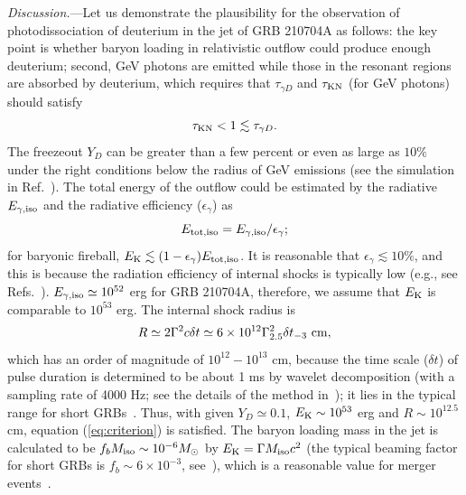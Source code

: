 \documentclass[prd,twocolumn,amsmath,amssymb,aps]{revtex4-2} %
\begin{document}
\textit{Discussion.}---Let us demonstrate
the plausibility for the observation of photodissociation of deuterium in the jet of GRB 210704A as follows: the key point is whether baryon loading in relativistic outflow could produce enough deuterium;
second, GeV photons are emitted while those in the resonant regions are absorbed by deuterium, which requires that $\tau_{\gamma D}$ and $\tau_{\rm KN}$ (for GeV photons) should satisfy 
\begin{equation}\label{eq:criterion}
    \tau_{\rm KN}<1\lesssim\tau_{\gamma D}.
\end{equation}
The freezeout $Y_{D}$ can be greater than a few percent or even as large as $10\%$ under the right conditions below the radius of GeV emissions (see the simulation in Ref.~\citep[][]{2002ApJ...580..368P}). The total energy of the outflow could be estimated by the radiative $E_{\gamma, \rm iso}$ and the radiative efficiency ($\epsilon_\gamma$) as
\begin{equation}
    E_{\rm tot, iso}= E_{\gamma, \rm iso}/\epsilon_\gamma;
\end{equation}
for baryonic fireball, $E_{\rm K}\lesssim (1-\epsilon_\gamma)E_{\rm tot, iso}$.
It is reasonable that $\epsilon_\gamma\lesssim10\%$, and this is because the radiation efficiency of internal shocks is typically low (e.g., see Refs.~\citep[][]{2011ApJ...726...90Z,2008FrPhC...3..306F}). $E_{\gamma, \rm iso}\simeq 10^{52}$ erg for GRB 210704A, therefore, we assume that $E_{\rm K}$ is comparable to $ 10^{53}$ erg. The internal shock radius is 
\begin{equation}
R \simeq 2 \Gamma^2 c \delta t \simeq 6 \times 10^{12} \Gamma_{2.5}^2 \delta t_{-3} \ {\rm cm},
\end{equation}
which has an order of magnitude of $10^{12}-10^{13}$ cm, because the time scale ($\delta t$) of pulse duration is determined to be about 1 ms by wavelet decomposition (with a sampling rate of 4000 Hz; see the details of the method in~\citep[][]{2013MNRAS.432..857M}); it lies in the typical range  for short GRBs~\cite{2014ARA&A..52...43B}. Thus, with given $Y_{D}\simeq0.1$, $E_{\rm K}\sim10^{53}$ erg and $R\sim10^{12.5}$ cm, equation (\ref{eq:criterion}) is satisfied. The baryon loading mass in the jet is calculated to be $f_{b}M_{\rm iso}\sim10^{-6}M_{\odot}$ by $E_{\rm K}=\Gamma M_{\rm iso}c^2$ (the typical beaming factor for short GRBs is $f_b\sim6\times10^{-3}$, see~\citep[][]{2014ARA&A..52...43B}), which is a reasonable value for merger events~\citep{2007PhR...442..166N,2019LRR....23....1M,2025PhRvD.111f3040S}.
\end{document}
